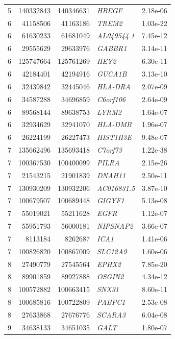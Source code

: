 \begin{longtable}{rrrlr}
    5 & 140332843 & 140346631 & \textit{HBEGF} & 2.18e-06 \\ 
    6 & 41158506 & 41163186 & \textit{TREM2} & 1.03e-22 \\ 
    6 & 61630233 & 61681049 & \textit{AL049544.1} & 7.45e-12 \\ 
    6 & 29555629 & 29633976 & \textit{GABBR1} & 3.14e-11 \\ 
    6 & 125747664 & 125761269 & \textit{HEY2} & 6.30e-11 \\ 
    6 & 42184401 & 42194916 & \textit{GUCA1B} & 3.13e-10 \\ 
    6 & 32439842 & 32445046 & \textit{HLA-DRA} & 2.07e-09 \\ 
    6 & 34587288 & 34696859 & \textit{C6orf106} & 2.64e-09 \\ 
    6 & 89568144 & 89638753 & \textit{LYRM2} & 1.64e-07 \\ 
    6 & 32934629 & 32941070 & \textit{HLA-DMB} & 1.96e-07 \\ 
    6 & 26224199 & 26227473 & \textit{HIST1H3E} & 9.48e-07 \\ 
    7 & 135662496 & 135693418 & \textit{C7orf73} & 1.22e-38 \\ 
    7 & 100367530 & 100400099 & \textit{PILRA} & 2.15e-26 \\ 
    7 & 21543215 & 21901839 & \textit{DNAH11} & 2.50e-11 \\ 
    7 & 130930209 & 130932206 & \textit{AC016831.5} & 3.87e-10 \\ 
    7 & 100679507 & 100689448 & \textit{GIGYF1} & 5.13e-08 \\ 
    7 & 55019021 & 55211628 & \textit{EGFR} & 1.12e-07 \\ 
    7 & 55951793 & 56000181 & \textit{NIPSNAP2} & 3.66e-07 \\ 
    7 & 8113184 & 8262687 & \textit{ICA1} & 1.41e-06 \\ 
    7 & 100826820 & 100867009 & \textit{SLC12A9} & 1.60e-06 \\ 
    8 & 27490779 & 27545564 & \textit{EPHX2} & 7.85e-20 \\ 
    8 & 89901859 & 89927888 & \textit{OSGIN2} & 4.34e-12 \\ 
    8 & 100572882 & 100663415 & \textit{SNX31} & 8.60e-11 \\ 
    8 & 100685816 & 100722809 & \textit{PABPC1} & 2.53e-08 \\ 
    8 & 27633868 & 27676776 & \textit{SCARA3} & 6.04e-08 \\ 
    9 & 34638133 & 34651035 & \textit{GALT} & 1.80e-07 \\ 

\end{longtable}
